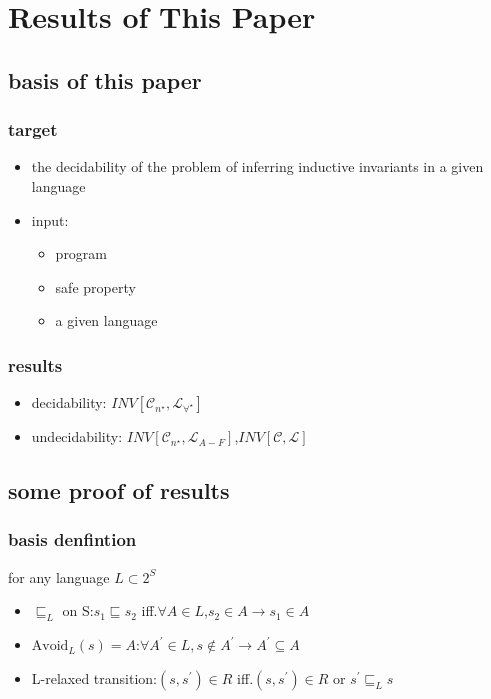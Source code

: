 \section{Results of This Paper}
\subsection{basis of this paper}
\begin{frame}
    \frametitle{target}
    \begin{itemize}
        \item the decidability of the problem of inferring inductive invariants in a given language
        \item input:
        \begin{itemize}
            \item program
            \item safe property
            \item a given language
        \end{itemize}
    \end{itemize}
\end{frame}
\begin{frame}
    \frametitle{results}
    \begin{itemize}
        \item decidability: $INV[\mathcal{C}_{n^{\star}},\mathcal{L}_{\forall^{\star}}]$
        \item undecidability: $INV[\mathcal{C}_{n^{\star}},\mathcal{L}_{A-F}]$,$INV[\mathcal{C},\mathcal{L}]$
    \end{itemize}
\end{frame}

\subsection{some proof of results}
\begin{frame}
    \frametitle{basis denfintion}
    for any language $L\subset 2^{S}$
    \begin{itemize}
        \item $\sqsubseteq_{L}$ on S:$s_{1}\sqsubseteq s_{2}$ iff.$\forall A\in L$,$s_{2}\in A\rightarrow s_{1}\in A$
        \item $\text{Avoid}_{L}(s)=A$:$\forall A^{\prime}\in L, s\notin A^{\prime}\rightarrow A^{\prime}\subseteq A$
        \item L-relaxed transition:$(s,s^{\prime})\in R$ iff.$(s,s^{\prime})\in R$ or $s^{\prime}\sqsubseteq_{L}s$
    \end{itemize}
\end{frame}

